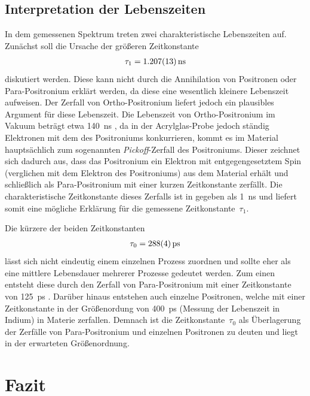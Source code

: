 \documentclass[11pt, a4paper]{article}
\numberwithin{equation}{section}
\begin{document}
\subsection{Interpretation der Lebenszeiten}
In dem gemessenen Spektrum treten zwei charakteristische Lebenszeiten auf.
Zunächst soll die Ursache der größeren Zeitkonstante
\begin{align*}
	\tau_1 = \SI{1.207+-0.013}{ns}
\end{align*}
diskutiert werden.
Diese kann nicht durch die Annihilation von Positronen oder Para-Positronium erklärt werden, da diese eine wesentlich kleinere Lebenszeit aufweisen.
Der Zerfall von Ortho-Positronium liefert jedoch ein plausibles Argument für diese Lebenszeit.
Die Lebenszeit von Ortho-Positronium im Vakuum beträgt etwa \SI{140}{ns} \cite{pos_annihilation}, da in der Acrylglas-Probe jedoch ständig Elektronen mit dem des Positroniums konkurrieren, kommt es im Material hauptsächlich zum sogenannten \textit{Pickoff}-Zerfall des Positroniums.
Dieser zeichnet sich dadurch aus, dass das Positronium ein Elektron mit entgegengesetztem Spin (verglichen mit dem Elektron des Positroniums) aus dem Material erhält und schließlich als Para-Positronium mit einer kurzen Zeitkonstante zerfällt.
Die charakteristische Zeitkonstante dieses Zerfalls ist in \cite{pos_annihilation} gegeben als \SI{1}{ns} und liefert somit eine mögliche Erklärung für die gemessene Zeitkonstante~$\tau_1$.

Die kürzere der beiden Zeitkonstanten
\begin{align*}
	\tau_0 = \SI{288 +- 4}{ps}
\end{align*}
lässt sich nicht eindeutig einem einzelnen Prozess zuordnen und sollte eher als eine mittlere Lebensdauer mehrerer Prozesse gedeutet werden.
Zum einen entsteht diese durch den Zerfall von Para-Positronium mit einer Zeitkonstante von \SI{125}{ps} \cite{pos_annihilation}.
Darüber hinaus entstehen auch einzelne Positronen, welche mit einer Zeitkonstante in der Größenordung von \SI{400}{ps} (Messung der Lebenszeit in Indium) in Materie zerfallen.
Demnach ist die Zeitkonstante~$\tau_0$ als Überlagerung der Zerfälle von Para-Positronium und einzelnen Positronen zu deuten und liegt in der erwarteten Größenordnung.

\section{Fazit}
\end{document}
